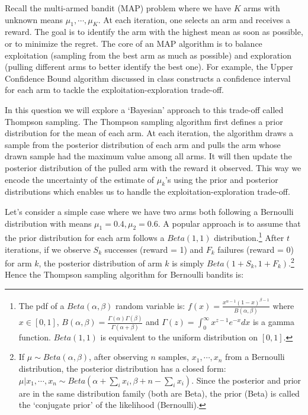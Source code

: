 
Recall the multi-armed bandit (MAP) problem where we have $K$ arms with unknown means $\mu_1,\cdots,\mu_K$. At each iteration, one selects an arm and receives a reward. The goal is to identify the arm with the highest mean as soon as possible, or to minimize the regret. The core of an MAP algorithm is to balance exploitation (sampling from the best arm as much as possible) and exploration (pulling different arms to better identify the best one). For example, the Upper Confidence Bound algorithm discussed in class constructs a confidence interval for each arm to tackle the exploitation-exploration trade-off. 

In this question we will explore a `Bayesian' approach to this trade-off called Thompson sampling. The Thompson sampling algorithm first defines a prior distribution for the mean of each arm. At each iteration, the algorithm draws a sample from the posterior distribution of each arm and pulls the arm whose drawn sample had the maximum value among all arms. It will then update the posterior distribution of the pulled arm with the reward it observed. This way we encode the uncertainty of the estimate of $\mu_k$'s using the prior and posterior distributions which enables us to handle the exploitation-exploration trade-off.

Let's consider a simple case where we have two arms both following a Bernoulli distribution with means $\mu_1=0.4, \mu_2=0.6$. A popular approach is to assume that the prior distribution for each arm follows a $Beta(1,1)$ distribution.\footnote{The pdf of a $Beta(\alpha,\beta)$ random variable is: $f(x) = \frac{x^{\alpha-1}(1-x)^{\beta-1}}{B(\alpha,\beta)}$ where $x\in [0,1]$, $B(\alpha,\beta)=\frac{\Gamma(\alpha)\Gamma(\beta)}{\Gamma(\alpha+\beta)}$ and $\Gamma(z)=\int_0^{\infty}x^{z-1}e^{-x}dx$ is a gamma function. $Beta(1,1)$ is equivalent to the uniform distribution on $[0,1]$.} After $t$ iterations, if we observe $S_k$ successes (reward = 1) and $F_k$ failures (reward = 0) for arm $k$, the posterior distribution of arm $k$ is simply $Beta(1+S_k,1+F_k)$.\footnote{If $\mu\sim Beta(\alpha,\beta)$, after observing $n$ samples, $x_1,\cdots,x_n$ from a Bernoulli distribution, the posterior distribution has a closed form: $\mu|x_1,
\cdots,x_n\sim Beta(\alpha+\sum_ix_i,\beta+n-\sum_ix_i)$. Since the posterior and prior are in the same distribution family (both are Beta), the prior (Beta) is called the `conjugate prior' of the likelihood (Bernoulli). } Hence the Thompson sampling algorithm for Bernoulli bandits is:

\vspace{7mm}

